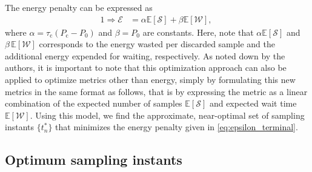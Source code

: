 The energy penalty can be expressed as~\cite{secAperiodic}
\begin{alignat}{1}
\Rightarrow\mathcal{E}&=\alpha\mathbb{E}[\mathcal{S}]+\beta\mathbb{E}[\mathcal{W}],\;\label{eq:epsilon_terminal}
\end{alignat}
where $\alpha\!=\!\tau_{\text{c}} (P_{\text{c}}\!-\!P_0)$ and $\beta\!=\!P_0$ are constants.
Here, note that $\alpha\mathbb{E}[\mathcal{S}]$ and $\beta\,\mathbb{E}[\mathcal{W}]$ corresponds to the energy wasted per discarded sample and the additional energy expended for waiting, respectively.
As noted down by the authors, it is important to note that this optimization approach can also be applied to optimize metrics other than energy, simply by formulating this new metrics in the same format as follows, that is by expressing the metric as a linear combination of the expected number of samples $\mathbb{E}[\mathcal{S}]$ and expected wait time $\mathbb{E}[\mathcal{W}]$.
Using this model, we find the approximate, near-optimal set of sampling instants $\{t_n^*\}$ that minimizes the energy penalty given in \cref{eq:epsilon_terminal}.


\subsection{Optimum sampling instants}\label{sec:aprxSol}

